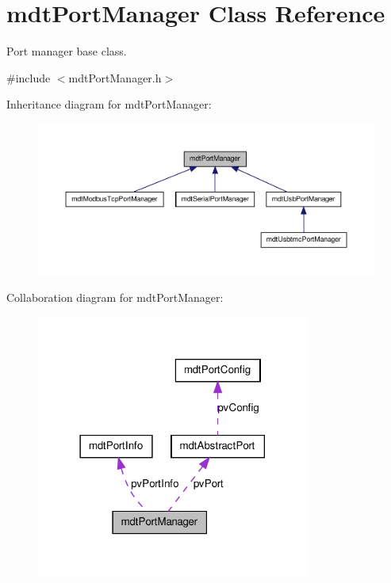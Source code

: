 \hypertarget{classmdt_port_manager}{
\section{mdtPortManager Class Reference}
\label{classmdt_port_manager}
}


Port manager base class.  




{\ttfamily \#include $<$mdtPortManager.h$>$}



Inheritance diagram for mdtPortManager:\nopagebreak
\begin{figure}[H]
\begin{center}
\leavevmode
\includegraphics[width=400pt]{classmdt_port_manager__inherit__graph}
\end{center}
\end{figure}


Collaboration diagram for mdtPortManager:\nopagebreak
\begin{figure}[H]
\begin{center}
\leavevmode
\includegraphics[width=254pt]{classmdt_port_manager__coll__graph}
\end{center}
\end{figure}
